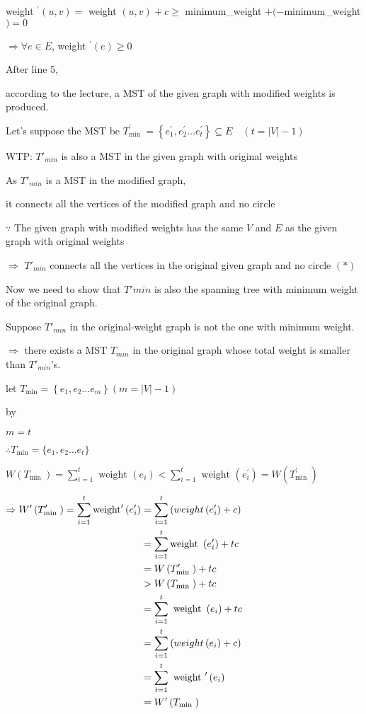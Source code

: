 \documentclass[12pt]{article}
\begin{document}
weight ${ }^{\prime}(u,  v)=$ weight $(u,  v)+c \geqslant$ minimum\_weight $+(-$minimum\_weight $)=0$

$\Rightarrow \forall e \in E$, weight ${ }^{\prime}(e) \geqslant 0$

After line 5,

according to the lecture, a MST of the given graph with modified weights is produced.

Let's suppose the MST be $T_{\text {min }}^{\prime}=\left\{e_1^{\prime},  e_2^{\prime}\ldots e_t^{\prime}\right\} \subseteq E \quad(t=|V|-1)$ 

WTP: $T'_{min}$ is also a MST in the given graph with original weights 

As $T'_{min}$ is a MST in the modified graph,

it connects all the vertices of the modified graph and no circle 

$\because$ The given graph with modified weights has the same $V$ and $E$ as the given graph with original weights

$\Rightarrow$ $T'_{min}$ connects all the vertices in the original given graph and no circle $(*)$

Now we need to show that $T'{min}$ is also the spanning tree with minimum weight of the original graph.

Suppose $T'_{min}$ in the original-weight graph is not the one with minimum weight.

$\Rightarrow$ there exists a MST $T_{min}$ in the original graph whose total weight is smaller than $T'_{min}$'s.

let $T_{\min }=\left\{e_1, e_2 \ldots e_m\right\} (m=|V|-1)$

by 

$m=t$

$\therefore T_{\min }=\{e_1, e_2 \ldots e_t\}$

$ W\left(T_{\text {min }}\right)=\sum\limits_{i=1}^t \text { weight }\left(e_i\right)<\sum\limits_{i=1}^t \text { weight }\left(e_i^{\prime}\right)=W\left(T_{\text {min }}^{\prime}\right) $

$\begin{aligned}
 \Rightarrow W^{\prime}\left(T_{\text {min }}^{\prime}\right)=\sum\limits_{i=1}^{ t} \text {weight}^{\prime}\left(e_i^{\prime}\right)&=\sum\limits_{i=1}^{ t} \text ({weight }\left(e_i^{\prime}\right)+c)\\
&=\sum\limits_{i=1}^{ t} \text {weight }\left(e_i^{\prime}\right)+tc\\
& =W\left(T_{\text {min }}^{\prime}\right)+t c \\
& >W\left(T_{\text {min }}\right)+t c \\
& =\sum\limits_{i=1}^t \text { weight }\left(e_i\right)+t c \\
& =\sum\limits_{i=1}^t \text ({ weight }\left(e_i\right)+c) \\
& =\sum\limits_{i=1}^t  \text { weight }^{\prime}\left(e_i\right) \\
& =W^{\prime}\left(T_{\text {min }}\right)
\end{aligned}
$
\end{document}
